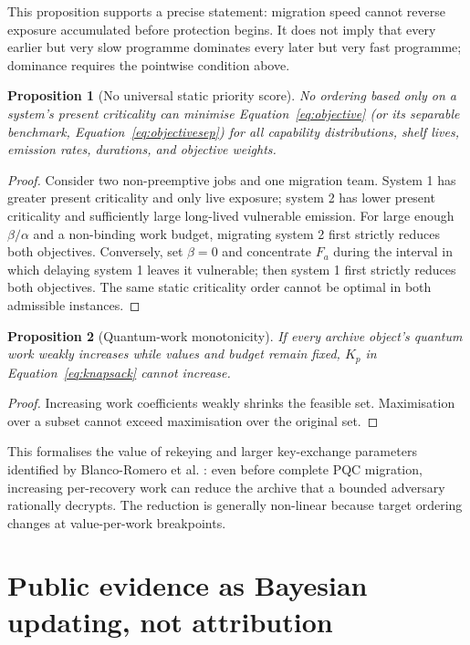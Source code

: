 \documentclass[10pt]{article}
\newtheorem{proposition}{Proposition}
\begin{document}
This proposition supports a precise statement: migration speed cannot reverse exposure accumulated before protection begins. It does not imply that every earlier but very slow programme dominates every later but very fast programme; dominance requires the pointwise condition above.

\begin{proposition}[No universal static priority score]
No ordering based only on a system's present criticality can minimise Equation~\eqref{eq:objective} (or its separable benchmark, Equation~\eqref{eq:objectivesep}) for all capability distributions, shelf lives, emission rates, durations, and objective weights.
\end{proposition}
\begin{proof}
Consider two non-preemptive jobs and one migration team. System 1 has greater present criticality and only live exposure; system 2 has lower present criticality and sufficiently large long-lived vulnerable emission. For large enough $\beta/\alpha$ and a non-binding work budget, migrating system 2 first strictly reduces both objectives. Conversely, set $\beta=0$ and concentrate $F_a$ during the interval in which delaying system 1 leaves it vulnerable; then system 1 first strictly reduces both objectives. The same static criticality order cannot be optimal in both admissible instances.
\end{proof}

\begin{proposition}[Quantum-work monotonicity]
If every archive object's quantum work weakly increases while values and budget remain fixed, $K_p$ in Equation~\eqref{eq:knapsack} cannot increase.
\end{proposition}
\begin{proof}
Increasing work coefficients weakly shrinks the feasible set. Maximisation over a subset cannot exceed maximisation over the original set.
\end{proof}

This formalises the value of rekeying and larger key-exchange parameters identified by Blanco-Romero et al. \cite{blanco2026}: even before complete PQC migration, increasing per-recovery work can reduce the archive that a bounded adversary rationally decrypts. The reduction is generally non-linear because target ordering changes at value-per-work breakpoints.

\section{Public evidence as Bayesian updating, not attribution}
\end{document}

